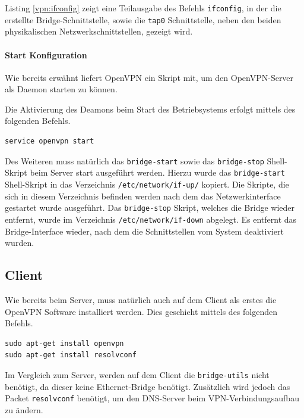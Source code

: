 

Listing \ref{vpn:ifconfig} zeigt eine Teilausgabe des Befehls \texttt{ifconfig}, in der die erstellte Bridge-Schnittstelle, sowie die \texttt{tap0} Schnittstelle, neben den beiden physikalischen Netzwerkschnittstellen, gezeigt wird.

\paragraph{Start Konfiguration}

Wie bereits erwähnt liefert OpenVPN ein Skript mit, um den OpenVPN-Server als Daemon starten zu können.

Die Aktivierung des Deamons beim Start des Betriebsystems erfolgt mittels des folgenden Befehls.

\begin{lstlisting}
service openvpn start
\end{lstlisting}

Des Weiteren muss natürlich das \texttt{bridge-start} sowie das \texttt{bridge-stop} Shell-Skript beim Server start ausgeführt werden. 
Hierzu wurde das \texttt{bridge-start} Shell-Skript in das Verzeichnis \texttt{/etc/network/if-up/} kopiert. Die Skripte, die sich in diesem Verzeichnis befinden werden nach dem das Netzwerkinterface gestartet wurde ausgeführt. Das \texttt{bridge-stop} Skript, welches die Bridge wieder entfernt, wurde im Verzeichnis \texttt{/etc/network/if-down} abgelegt. Es entfernt das Bridge-Interface wieder, nach dem die Schnittstellen vom System deaktiviert wurden.

\subsection{Client}

Wie bereits beim Server, muss natürlich auch auf dem Client als erstes die OpenVPN Software installiert werden. Dies geschieht mittels des folgenden Befehls.

\begin{lstlisting}
sudo apt-get install openvpn
sudo apt-get install resolvconf
\end{lstlisting}

Im Vergleich zum Server, werden auf dem Client die \texttt{bridge-utils} nicht benötigt, da dieser keine Ethernet-Bridge benötigt. Zusätzlich wird jedoch das Packet \texttt{resolvconf} benötigt, um den DNS-Server beim VPN-Verbindungsaufbau zu ändern.

